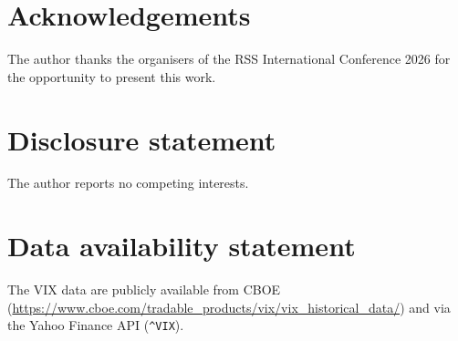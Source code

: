 \documentclass[12pt,a4paper]{article}
\begin{document}
\section*{Acknowledgements}
The author thanks the organisers of the RSS International Conference 2026
for the opportunity to present this work.

\section*{Disclosure statement}
The author reports no competing interests.

\section*{Data availability statement}
The VIX data are publicly available from CBOE
(\url{https://www.cboe.com/tradable_products/vix/vix_historical_data/})
and via the Yahoo Finance API (\texttt{\^{}VIX}).


\end{document}
